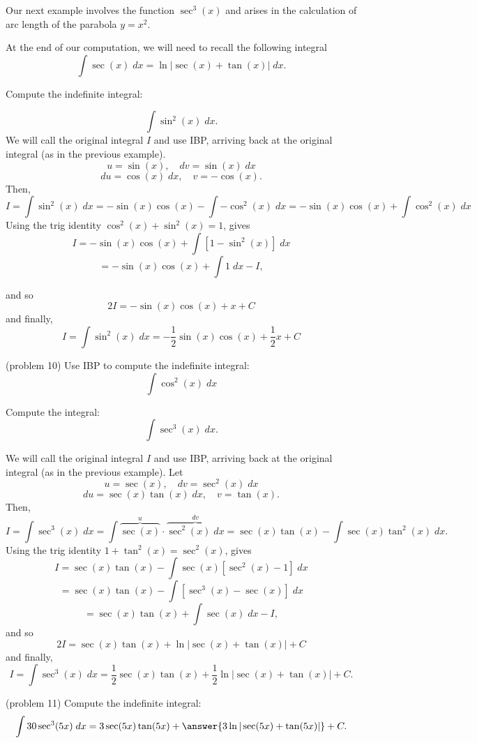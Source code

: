 \documentclass[handout]{ximera}
\begin{document}
Our next example involves the function $\sec^3(x)$ and arises in the calculation of arc length 
of the parabola $y = x^2$.

At the end of our computation, we will need to recall the following integral
\[
\int \sec(x) \; dx = \ln|\sec(x) + \tan(x)| \; dx.
\]

\begin{example}[example 10]
Compute the indefinite integral:

\[
\int \sin^2(x) \; dx.
\]
We will call the original integral $I$ and use IBP, arriving back at the original integral (as in the previous example).
\[
u = \sin(x), \quad dv = \sin(x) \; dx
\]
\[
du = \cos(x) \; dx, \quad v = -\cos(x).
\]
Then,
\[
I = \int \sin^2(x) \; dx = -\sin(x)\cos(x) - \int -\cos^2(x) \; dx =  -\sin(x)\cos(x) + \int \cos^2(x) \; dx
\]
Using the trig identity $\cos^2(x) + \sin^2(x) = 1$, gives
\[
I = -\sin(x)\cos(x) + \int \left[1-\sin^2(x)\right] \; dx
\]
\[
=-\sin(x)\cos(x) + \int 1 \; dx - I,
\]

and so
\[
2I = -\sin(x)\cos(x) + x + C
\]
and finally,
\[
I = \int \sin^2(x) \; dx = -\frac12 \sin(x)\cos(x) + \frac12 x + C
\]
\end{example}

\begin{problem}(problem 10)
Use IBP to compute the indefinite integral:
\[
\int \cos^2(x) \; dx
\]
\end{problem}



\begin{example}[example 11]
Compute the integral:
\[
\int \sec^3(x) \; dx.
\]

We will call the original integral $I$ and use IBP, arriving back at the original integral (as in the previous example).
Let
\[
u = \sec(x), \quad dv = \sec^2(x) \; dx
\]
\[
du = \sec(x)\tan(x) \; dx, \quad v = \tan(x).
\]
Then,
\[
I = \int \sec^3(x) \; dx = \int \overbrace{\sec(x)}^u \cdot \overbrace{\sec^2(x) \; dx}^{dv} = \sec(x) \tan(x) - \int \sec(x) \tan^2(x) \; dx.
\]
Using the trig identity $1 + \tan^2(x) = \sec^2(x)$, gives
\[
I = \sec(x) \tan(x) - \int \sec(x) [\sec^2(x) -1] \; dx
\]
\[
=\sec(x) \tan(x) - \int  [\sec^3(x) -\sec(x)] \; dx 
\]
\[
= \sec(x) \tan(x) + \int \sec(x)\; dx -I,
\]
and so
\[
2I = \sec(x) \tan(x) + \ln|\sec(x) + \tan(x)| + C
\]
and finally,
\[
I = \int \sec^3(x) \; dx = \frac12 \sec(x) \tan(x) + \frac12 \ln|\sec(x) + \tan(x)| + C.
\]
\end{example}

\begin{problem}(problem 11)
Compute the indefinite integral:
\[
\int 30\sec^3(5x) \; dx = 3\sec(5x) \tan(5x) +  \answer{3\ln|\sec(5x) + \tan(5x)|} + C.
\]
\end{problem}
\end{document}
